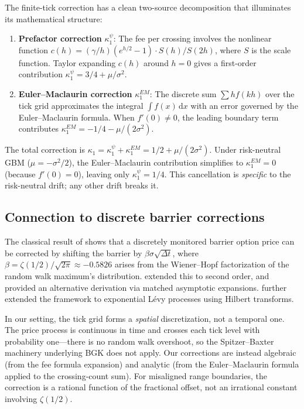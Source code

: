 \documentclass[11pt]{article}
\theoremstyle{definition}
\theoremstyle{remark}
\newcommand{\dd}{\,\mathrm{d}}
\begin{document}
The finite-tick correction has a clean two-source decomposition that
illuminates its mathematical structure:
\begin{enumerate}[label=(\roman*)]
\item \textbf{Prefactor correction} $\kappa_1^{\psi}$: The fee per
crossing involves the nonlinear function
$c(h) = (\gamma/h)(e^{h/2} - 1) \cdot S(h)/S(2h)$, where $S$ is the
scale function. Taylor expanding $c(h)$ around $h = 0$ gives a
first-order contribution $\kappa_1^{\psi} = 3/4 + \mu/\sigma^2$.
\item \textbf{Euler--Maclaurin correction} $\kappa_1^{EM}$: The
discrete sum $\sum h f(kh)$ over the tick grid approximates the
integral $\int f(x)\dd x$ with an error governed by the
Euler--Maclaurin formula. When $f'(0) \ne 0$, the leading boundary
term contributes
$\kappa_1^{EM} = -1/4 - \mu/(2\sigma^2)$.
\end{enumerate}
The total correction is
$\kappa_1 = \kappa_1^{\psi} + \kappa_1^{EM} = 1/2 + \mu/(2\sigma^2)$.
Under risk-neutral GBM ($\mu = -\sigma^2/2$), the Euler--Maclaurin
contribution simplifies to $\kappa_1^{EM} = 0$ (because $f'(0) = 0$),
leaving only $\kappa_1^{\psi} = 1/4$. This cancellation is
\emph{specific} to the risk-neutral drift; any other drift breaks it.

\subsection{Connection to discrete barrier corrections}

The classical result of \citet{BGK1997,BGK1999} shows that a
discretely monitored barrier option price can be corrected by shifting
the barrier by $\beta\sigma\sqrt{\Delta t}$, where
$\beta = \zeta(1/2)/\sqrt{2\pi} \approx -0.5826$ arises from the
Wiener--Hopf factorization of the random walk maximum's distribution.
\citet{Horfelt2003} extended this to second order, and
\citet{HowisonSteinberg2007} provided an alternative derivation via
matched asymptotic expansions. \citet{FengLinetsky2008} further
extended the framework to exponential L\'evy processes using
Hilbert transforms.

In our setting, the tick grid forms a \emph{spatial} discretization,
not a temporal one. The price process is continuous in time and crosses
each tick level with probability one---there is no random walk
overshoot, so the Spitzer--Baxter machinery underlying BGK does not
apply. Our corrections are instead algebraic (from the fee formula
expansion) and analytic (from the Euler--Maclaurin formula applied to
the crossing-count sum). For misaligned range boundaries, the
correction is a rational function of the fractional offset, not an
irrational constant involving $\zeta(1/2)$.
\end{document}
